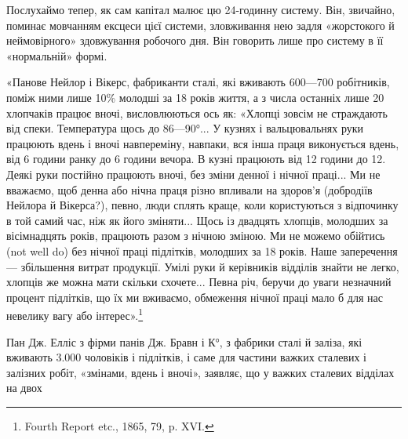Послухаймо тепер, як сам капітал малює цю 24-годинну
систему. Він, звичайно, поминає мовчанням ексцеси цієї системи,
зловживання нею задля «жорстокого й неймовірного» здовжування
робочого дня. Він говорить лише про систему в її «нормальній»
формі.

«Панове Нейлор і Вікерс, фабриканти сталі, які вживають
600—700 робітників, поміж ними лише 10\% молодші за 18 років
життя, а з числа останніх лише 20 хлопчаків працює вночі,
висловлюються ось як: «Хлопці зовсім не страждають від спеки.
Температура щось до 86—90°... У кузнях і вальцювальнях
руки працюють вдень і вночі навпереміну, навпаки, вся інша
праця виконується вдень, від 6 години ранку до 6 години вечора.
В кузні працюють від 12 години до 12. Деякі руки постійно працюють
вночі, без зміни денної і нічної праці... Ми не вважаємо,
щоб денна або нічна праця різно впливали на здоров’я (добродіїв
Нейлора й Вікерса?), певно, люди сплять краще, коли користуються
з відпочинку в той самий час, ніж як його зміняти...
Щось із двадцять хлопців, молодших за вісімнадцять років,
працюють разом з нічною зміною. Ми не можемо обійтись (not
well do) без нічної праці підлітків, молодших за 18 років. Наше
заперечення — збільшення витрат продукції. Умілі руки й
керівників відділів знайти не легко, хлопців же можна мати
скільки схочете... Певна річ, беручи до уваги незначний процент
підлітків, що їх ми вживаємо, обмеження нічної праці мало б
для нас невелику вагу або інтерес».\footnote{
Fourth Report etc., 1865, 79, p. XVI.
}

Пан Дж. Елліс з фірми панів Дж. Бравн і К°, з фабрики
сталі й заліза, які вживають 3.000 чоловіків і підлітків,
і саме для частини важких сталевих і залізних робіт, «змінами,
вдень і вночі», заявляє, що у важких сталевих відділах на двох

